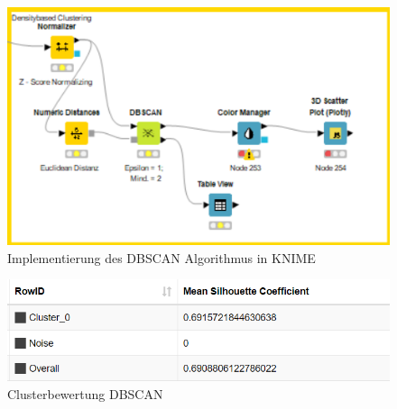 \documentclass[
	handout,
  	aspectratio=169
]{beamer}
\begin{document}
	\begin{frame}
	\begin{center}					
					\begin{figure}[h]
						\includegraphics[scale=0.7]{../pictures/dichte.png}
						\caption{Implementierung des DBSCAN Algorithmus in KNIME}		
					\end{figure}	
				\end{center}	
	\end{frame}
	\begin{frame}
	\begin{center}					
					\begin{figure}[h]
						\includegraphics[scale=0.7]{../pictures/sil_dens.png}
						\caption{Clusterbewertung DBSCAN}		
					\end{figure}	
				\end{center}	
	\end{frame}
	
\end{document}
